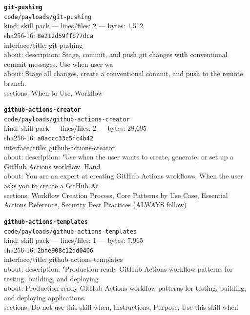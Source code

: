\noindent\textbf{\texttt{git-pushing}}\\
\texttt{code/payloads/git-pushing}\\
kind: skill pack --- lines/files: 2 --- bytes: 1,512\\
sha256-16: \texttt{8e212d59ffb77dca}\\
interface/title: git-pushing\\
about: description: Stage, commit, and push git changes with conventional commit messages. Use when user wa\\
about: Stage all changes, create a conventional commit, and push to the remote branch.\\
sections: When to Use, Workflow\\
\vspace*{6.0pt}
\newpage

\noindent\textbf{\texttt{github-actions-creator}}\\
\texttt{code/payloads/github-actions-creator}\\
kind: skill pack --- lines/files: 2 --- bytes: 28,695\\
sha256-16: \texttt{a0accc33c5fc4b42}\\
interface/title: github-actions-creator\\
about: description: "Use when the user wants to create, generate, or set up a GitHub Actions workflow. Hand\\
about: You are an expert at creating GitHub Actions workflows. When the user asks you to create a GitHub Ac\\
sections: Workflow Creation Process, Core Patterns by Use Case, Essential Actions Reference, Security Best Practices (ALWAYS follow)\\
\vspace*{6.0pt}

\noindent\textbf{\texttt{github-actions-templates}}\\
\texttt{code/payloads/github-actions-templates}\\
kind: skill pack --- lines/files: 1 --- bytes: 7,965\\
sha256-16: \texttt{2bfe908c12dd0406}\\
interface/title: github-actions-templates\\
about: description: "Production-ready GitHub Actions workflow patterns for testing, building, and deploying\\
about: Production-ready GitHub Actions workflow patterns for testing, building, and deploying applications.\\
sections: Do not use this skill when, Instructions, Purpose, Use this skill when\\
\vspace*{6.0pt}

